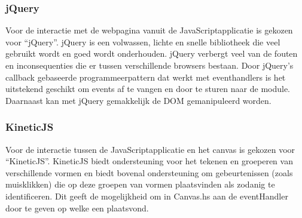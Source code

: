 \subsubsection{jQuery}
Voor de interactie met de webpagina vanuit de JavaScriptapplicatie is gekozen voor ``jQuery''\cite{jQuery}. jQuery is een volwassen, lichte en snelle bibliotheek die veel gebruikt wordt en goed wordt onderhouden. jQuery verbergt veel van de fouten en inconsequenties die er tussen verschillende browsers bestaan. Door jQuery's callback gebaseerde programmeerpattern dat werkt met eventhandlers is het uitstekend geschikt om events af te vangen en door te sturen naar de module. Daarnaast kan met jQuery gemakkelijk de DOM gemanipuleerd worden.

\subsubsection{KineticJS}
Voor de interactie tussen de JavaScriptapplicatie en het canvas is gekozen voor ``KineticJS''\cite{KineticJS}. KineticJS biedt ondersteuning voor het tekenen en groeperen van verschillende vormen en biedt bovenal ondersteuning om gebeurtenissen (zoals muisklikken) die op deze groepen van vormen plaatsvinden als zodanig te identificeren. Dit geeft de mogelijkheid om in Canvas.hs aan de eventHandler door te geven op welke  een  plaatsvond.
